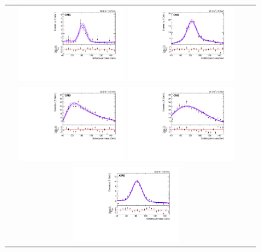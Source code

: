 \begin{figure}[htbp] 
	 \centering 
	 \begin{tabular}{cc}
	 \includegraphics[width=0.45\textwidth]{Plots/BackgroundEstimation/WV/m_j_fitting/_STop_xwwWWTree_STop_ExpGaus_with_pull.pdf}
	 \includegraphics[width=0.45\textwidth]{Plots/BackgroundEstimation/WV/m_j_fitting/_TTbar_xwwWWTree_TTbar_2Gaus_ErfExp_with_pull.pdf}\\
	 \includegraphics[width=0.45\textwidth]{Plots/BackgroundEstimation/WV/m_j_fitting/_WJets01_xwwWWTree_VJets_ErfExp_with_pull.pdf}
	 \includegraphics[width=0.45\textwidth]{Plots/BackgroundEstimation/WV/m_j_fitting/_WJets0_xwwWWTree_VJets_User1_with_pull.pdf}\\
	 \includegraphics[width=0.45\textwidth]{Plots/BackgroundEstimation/WV/m_j_fitting/_VV_xwwWWTree_VV_EWK_QCD_ExpGaus_with_pull.pdf}\\

\end{tabular}
\end{figure}
